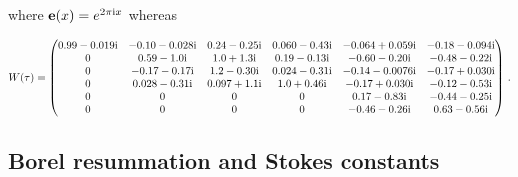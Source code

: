 \documentclass[12pt,reqno]{amsart}
\theoremstyle{definition}
\def\be{\begin{equation}}
\def\ee{\end{equation}}
\def\e{\bold e}
\def\ri{\mathrm{i}}
\def\ri{{\rm i}}
\def\e{\bold e}
\begin{document}
where $\e(x)=e^{2 \pi \ri x}$ whereas
\begin{tiny}
\be
W(\tau)=
\begin{pmatrix}
  0.99 - 0.019\ri & -0.10 - 0.028\ri & 0.24 - 0.25\ri & 0.060 - 0.43\ri & -0.064 + 0.059\ri
  & -0.18 - 0.094\ri\\
0 & 0.59 - 1.0\ri & 1.0 + 1.3\ri & 0.19 - 0.13\ri & -0.60 - 0.20\ri & -0.48 - 0.22\ri\\
0 & -0.17 - 0.17\ri & 1.2 - 0.30\ri & 0.024 - 0.31\ri & -0.14 - 0.0076\ri & -0.17 + 0.030\ri\\
0 & 0.028 - 0.31\ri & 0.097 + 1.1\ri & 1.0 + 0.46\ri & -0.17 + 0.030\ri & -0.12 - 0.53\ri\\
0 & 0 & 0 & 0 & 0.17 - 0.83\ri & -0.44 - 0.25\ri\\
0 & 0 & 0 & 0 & -0.46 - 0.26\ri & 0.63 - 0.56\ri
\end{pmatrix} \,.
\ee
\end{tiny}

\subsection{Borel resummation and Stokes constants}
\label{sub.52borel}
\end{document}
